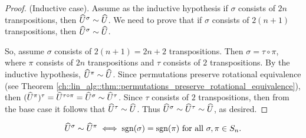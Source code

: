 \begin{proof}
    (Inductive case). Assume as the inductive hypothesis if $\sigma$ consists of $2n$ transpositions, then $\widehat{U}^\sigma \sim \widehat{U}$. We need to prove that if $\sigma$ consists of $2(n + 1)$ transpositions, then $\widehat{U}^\sigma \sim \widehat{U}$.

    So, assume $\sigma$ consists of $2(n + 1) = 2n + 2$ transpositions. Then $\sigma = \tau \circ \pi$, where $\pi$ consists of $2n$ transpositions and $\tau$ consists of $2$ transpositions. By the inductive hypothesis, $\widehat{U}^\pi \sim \widehat{U}$. Since permutations preserve rotational equivalence (see Theorem \ref{ch::lin_alg::thm::permutations_preserve_rotational_equivalence}), then $(\widehat{U}^\pi)^\tau = \widehat{U}^{\tau \circ \pi} = \widehat{U}^\sigma \sim \widehat{U}^\tau$. Since $\tau$ consists of $2$ transpositions, then from the base case it follows that $\widehat{U}^\tau \sim \widehat{U}$. Thus $\widehat{U}^\sigma \sim \widehat{U}^\tau \sim \widehat{U}$, as desired.
\end{proof}

\begin{theorem}
    \begin{align*}
        \widehat{U}^\sigma \sim \widehat{U}^\pi \iff \text{sgn}(\sigma) = \text{sgn}(\pi) \text{ for all $\sigma, \pi \in S_n$}.
    \end{align*}
\end{theorem}

